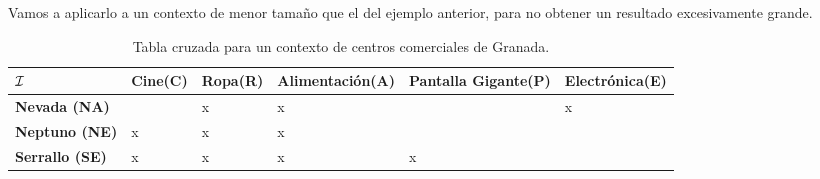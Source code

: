 \documentclass[oneside,openright,titlepage,numbers=noenddot,openany,headinclude,footinclude=true,
cleardoublepage=empty,abstractoff,BCOR=5mm,paper=a4,fontsize=12pt,main=spanish]{scrreprt}
\begin{document}
Vamos a aplicarlo a un contexto de menor tamaño que el del ejemplo anterior, para no obtener un resultado excesivamente grande.

\begin{exampleth}
\label{ejemplocomerciales}

\begin{table}[H]
\centering
\resizebox{16.0cm}{!} {
\begin{tabular}{|l|l|l|l|l|l|}
\hline
$\mathcal{I}$                   & \textbf{Cine(C)} & \textbf{Ropa(R)} & \textbf{Alimentación(A)} & \textbf{Pantalla Gigante(P)} & \textbf{Electrónica(E)} \\ \hline
\textbf{Nevada (NA)}   &               & x             & x                     &     &x                   \\ \hline
\textbf{Neptuno (NE)}  & x             & x             & x                     &       &                    \\ \hline
\textbf{Serrallo (SE)} & x             & x             & x                     &     x    &                  \\ \hline
\end{tabular}
}
\caption{Tabla cruzada para un contexto de centros comerciales de Granada.}
\label{tab:my-table}
\end{table}





\end{exampleth}
\end{document}
